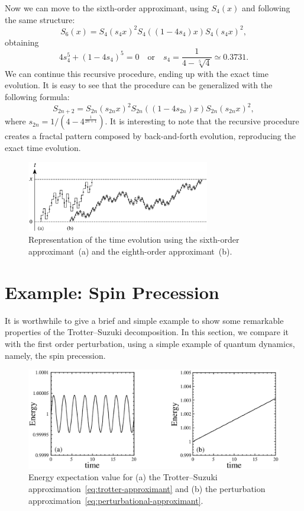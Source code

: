 Now we can move to the sixth-order approximant, using $S_4(x)$ and following the same structure:
\begin{equation} \label{eq:sixth-order}
S_6(x) = S_4(s_4x)^2 S_4((1-4s_4)x) S_4(s_4x)^2,
\end{equation}
obtaining
\begin{equation}
4s_4^5 + (1-4s_4)^5 = 0 \quad \mathrm{or} \quad s_4 = \frac{1}{4-\sqrt[5]{4}} \simeq 0.3731.
\end{equation}
We can continue this recursive procedure, ending up with the exact time evolution. It is easy to see that the procedure can be generalized with the following formula:
\begin{equation}
S_{2n+2} = S_{2n}(s_{2n}x)^2 S_{2n}((1-4s_{2n})x) S_{2n}(s_{2n}x)^2,
\end{equation}
where $s_{2n} = 1/(4-4^{\frac{1}{2n+1}})$.
It is interesting to note that the recursive procedure creates a fractal pattern composed by back-and-forth evolution, reproducing the exact time evolution.
\begin{figure}
  \centering
   \includegraphics[width=8cm]{Plots/fractal_evolution.eps}
   \caption{Representation of the time evolution using the sixth-order approximant~(a) and the eighth-order approximant~(b).} \label{plot:fractal-evolution}
\end{figure}

\section{Example: Spin Precession}
It is worthwhile to give a brief and simple example to show some remarkable properties of the Trotter--Suzuki decomposition. In this section, we compare it with the first order perturbation, using a simple example of quantum dynamics, namely, the spin precession.

\begin{figure}[t]
  \centering
   \includegraphics[width=12cm]{Plots/spin_evolution.eps}
   \caption{Energy expectation value for (a) the Trotter--Suzuki approximation~\eqref{eq:trotter-approximant} and (b) the perturbation approximation~\eqref{eq:perturbational-approximant}.} \label{plot:spin-evolution}
\end{figure}

